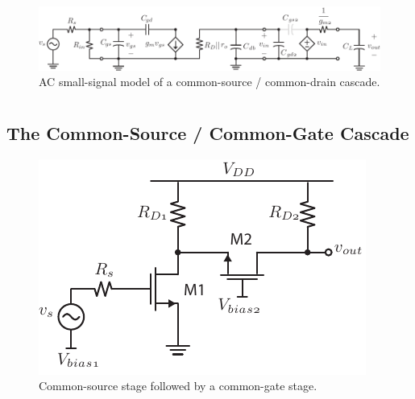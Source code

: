 \begin{figure}[tb]
\begin{center}
\includegraphics[scale=1]{9cs_cd_casc_ss}
\end{center}
\caption{AC small-signal model of a common-source / common-drain cascade.}
\label{fig:9cs_cd_casc_ss}
\end{figure}
\section{\topicD}
\subsection{The Common-Source / Common-Gate Cascade}
\begin{figure}[tb]
\begin{center}
\includegraphics[scale=1]{10cs_cg_cascade}
\end{center}
\caption{Common-source stage followed by a common-gate stage.}
\label{fig:10cs_cg_cascade}
\end{figure}

